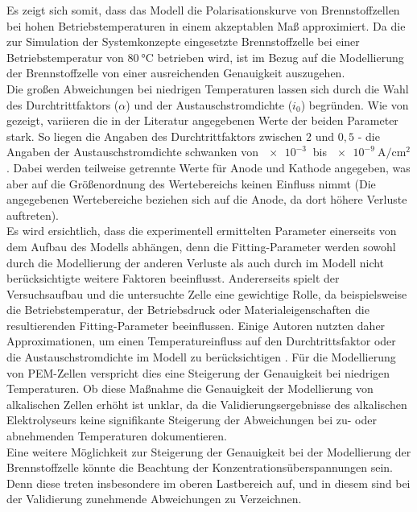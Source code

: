 Es zeigt sich somit, dass das Modell die Polarisationskurve von Brennstoffzellen bei hohen Betriebstemperaturen in einem akzeptablen Maß approximiert. Da die zur Simulation der Systemkonzepte eingesetzte Brennstoffzelle bei einer Betriebstemperatur von $\SI{80}{\degreeCelsius}$ betrieben wird, ist im Bezug auf die Modellierung der Brennstoffzelle von einer ausreichenden Genauigkeit auszugehen.\\
Die großen Abweichungen bei niedrigen Temperaturen lassen sich durch die Wahl des Durchtrittfaktors ($\alpha$) und der Austauschstromdichte ($i_0$) begründen. Wie von \citet{falcao_review_2020} gezeigt, variieren die in der Literatur angegebenen Werte der beiden Parameter stark. So liegen die Angaben des Durchtrittfaktors zwischen $2$ und $0,5$ - die Angaben der Austauschstromdichte schwanken von $\SI{e-3}{}$ bis $\SI{e-9}{\A\per\cm\squared}$. Dabei werden teilweise getrennte Werte für Anode und Kathode angegeben, was aber auf die Größenordnung des Wertebereichs keinen Einfluss nimmt (Die angegebenen Wertebereiche beziehen sich auf die Anode, da dort höhere Verluste auftreten).\\
Es wird ersichtlich, dass die experimentell ermittelten Parameter einerseits von dem Aufbau des Modells abhängen, denn die Fitting-Parameter werden sowohl durch die Modellierung der anderen Verluste als auch durch im Modell nicht berücksichtigte weitere Faktoren beeinflusst. Andererseits spielt der Versuchsaufbau und die untersuchte Zelle eine gewichtige Rolle, da beispielsweise die Betriebstemperatur, der Betriebsdruck oder Materialeigenschaften die resultierenden Fitting-Parameter beeinflussen.
Einige Autoren nutzten daher Approximationen, um einen Temperatureinfluss auf den Durchtrittsfaktor oder die Austauschstromdichte im Modell zu berücksichtigen \citep{falcao_review_2020,milewski_modeling_2014}. Für die Modellierung von PEM-Zellen verspricht dies eine 
Steigerung der Genauigkeit bei niedrigen Temperaturen. Ob diese Maßnahme die Genauigkeit der Modellierung von alkalischen Zellen erhöht ist unklar, da die Validierungsergebnisse des alkalischen Elektrolyseurs keine signifikante Steigerung der Abweichungen bei zu- oder abnehmenden Temperaturen dokumentieren.\\
Eine weitere Möglichkeit zur Steigerung der Genauigkeit bei der Modellierung der Brennstoffzelle könnte die Beachtung der Konzentrationsüberspannungen sein. Denn diese treten insbesondere im oberen Lastbereich auf, und in diesem sind bei der Validierung zunehmende Abweichungen zu Verzeichnen.\\

